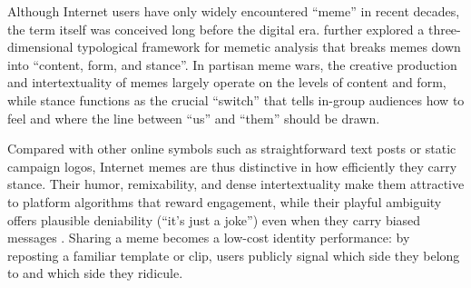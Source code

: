 \documentclass[12pt,twoside]{article}
\begin{document}

Although Internet users have only widely encountered ``meme'' in recent decades, the term itself was conceived long before the digital era. \textcite{shifman2013memesdigitalworld} further explored a three-dimensional typological framework for memetic analysis that breaks memes down into ``content, form, and stance''. In partisan meme wars, the creative production and intertextuality of memes largely operate on the levels of content and form, while stance functions as the crucial ``switch'' that tells in-group audiences how to feel and where the line between ``us'' and ``them'' should be drawn.

Compared with other online symbols such as straightforward text posts or static campaign logos, Internet memes are thus distinctive in how efficiently they carry stance. Their humor, remixability, and dense intertextuality make them attractive to platform algorithms that reward engagement, while their playful ambiguity offers plausible deniability (``it's just a joke'') even when they carry biased messages \parencite{yoon2016notjustajoke}. Sharing a meme becomes a low-cost identity performance: by reposting a familiar template or clip, users publicly signal which side they belong to and which side they ridicule.
 
\end{document}
